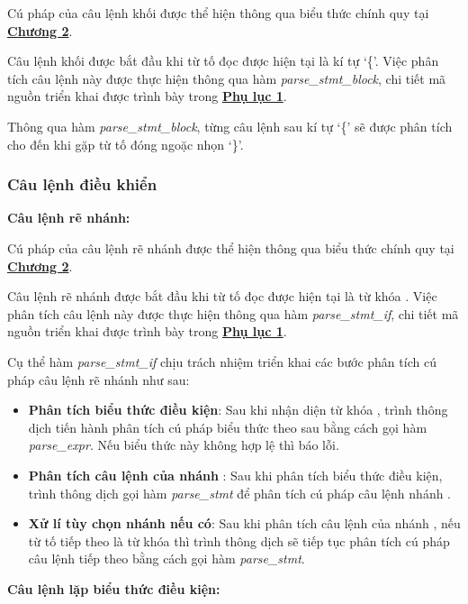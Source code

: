 Cú pháp của câu lệnh khối được thể hiện thông qua biểu thức chính quy tại \hyperref[ch2:block_stmt]{\bf Chương 2}.

Câu lệnh khối được bắt đầu khi từ tố đọc được hiện tại là kí tự `\{'. Việc phân tích câu lệnh này được thực hiện thông qua hàm \textit{parse\_stmt\_block}, chi tiết mã nguồn triển khai được trình bày trong \hyperref[ap1:stmt_block]{\bf Phụ lục 1}. %

Thông qua hàm \textit{parse\_stmt\_block}, từng câu lệnh sau kí tự `\{' sẽ được phân tích cho đến khi gặp từ tố đóng ngoặc nhọn `\}'.

\subsubsection{Câu lệnh điều khiển}

\noindent\textbf{Câu lệnh rẽ nhánh:} 

Cú pháp của câu lệnh rẽ nhánh được thể hiện thông qua biểu thức chính quy tại \hyperref[ch2:if_stmt]{\bf Chương 2}.

Câu lệnh rẽ nhánh được bắt đầu khi từ tố đọc được hiện tại là từ khóa . Việc phân tích câu lệnh này được thực hiện thông qua hàm \textit{parse\_stmt\_if}, chi tiết mã nguồn triển khai được trình bày trong \hyperref[ap1:stmt_when]{\bf Phụ lục 1}. %

Cụ thể hàm \textit{parse\_stmt\_if} chịu trách nhiệm triển khai các bước phân tích cú pháp câu lệnh rẽ nhánh như sau:
\begin{itemize}
    \item \textbf{Phân tích biểu thức điều kiện}: 
    Sau khi nhận diện từ khóa , trình thông dịch tiến hành phân tích cú pháp biểu thức theo sau bằng cách gọi hàm \textit{parse\_expr}. Nếu biểu thức này không hợp lệ thì báo lỗi.
    \item \textbf{Phân tích câu lệnh của nhánh }: 
    Sau khi phân tích biểu thức điều kiện, trình thông dịch gọi hàm \textit{parse\_stmt} để phân tích cú pháp câu lệnh nhánh .
    \item \textbf{Xử lí tùy chọn nhánh  nếu có}:
    Sau khi phân tích câu lệnh của nhánh , nếu từ tố tiếp theo là từ khóa  thì trình thông dịch sẽ tiếp tục phân tích cú pháp câu lệnh tiếp theo bằng cách gọi hàm \textit{parse\_stmt}.
\end{itemize}


\noindent\textbf{Câu lệnh lặp biểu thức điều kiện:}

